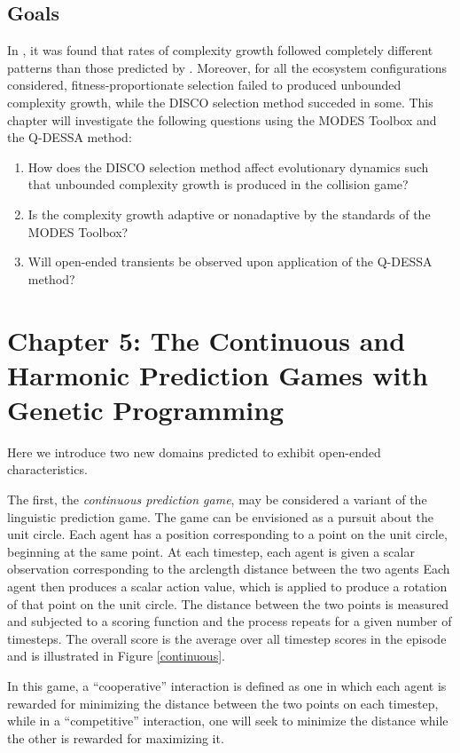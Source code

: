 \documentclass{article}
\begin{document}
\subsection*{Goals}
In \citet{willkens2022}, it was found that rates of complexity growth followed completely different 
patterns than those predicted by \citet{moran2019evolving}. Moreover, for all the ecosystem
configurations considered, fitness-proportionate selection failed to produced unbounded
complexity growth, while the DISCO selection method succeded in some. This chapter will investigate the
following questions using the MODES Toolbox and the Q-DESSA method:
\begin{enumerate}
    \item How does the DISCO selection method affect evolutionary dynamics such that 
        unbounded complexity growth is produced in the collision game?
    \item Is the complexity growth adaptive or nonadaptive by the standards of the MODES Toolbox?
    \item Will open-ended transients be observed upon application of the Q-DESSA method?
\end{enumerate}

\section*{Chapter 5: The Continuous and Harmonic Prediction Games with Genetic Programming}
Here we introduce two new domains predicted to exhibit open-ended characteristics. 

The first, the \textit{continuous prediction game}, may be considered a variant of the linguistic
prediction game. The game can be envisioned as a pursuit about the unit circle. Each agent has a
position corresponding to a point on the unit circle, beginning at the same point. At each timestep,
each agent is given a scalar observation corresponding to the arclength distance between the two agents
Each agent then produces a scalar action value, which is applied to produce a rotation of that point
on the unit circle. The distance between the two points is measured and subjected to a scoring function 
and the process repeats for a given number of timesteps. The overall score is the average over 
all timestep scores in the episode and is illustrated in Figure \ref{continuous}.

In this game, a ``cooperative'' interaction is defined as one in which each agent is rewarded for minimizing the
distance between the two points on each timestep, while in a ``competitive'' interaction, one
will seek to minimize the distance while the other is rewarded for maximizing it. 
\end{document}
